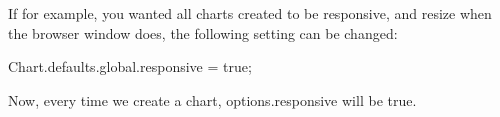 If for example, you wanted all charts created to be responsive, and resize when the browser window does, the following setting can be changed\+:


\begin{DoxyCode}
Chart.defaults.global.responsive = true;
\end{DoxyCode}


Now, every time we create a chart, {\ttfamily options.\+responsive} will be {\ttfamily true}. 